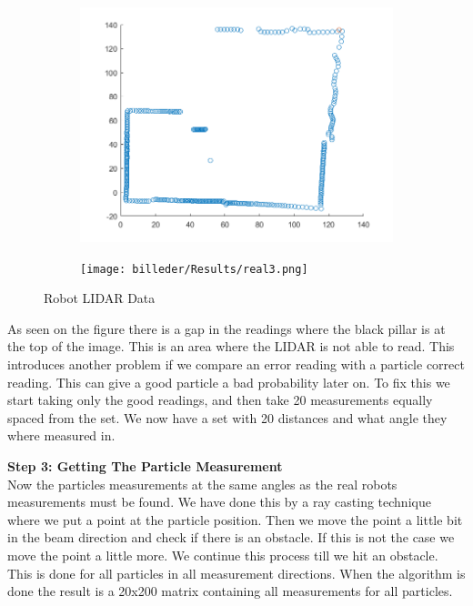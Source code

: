 \begin{figure}[H]
\centering
\begin{subfigure}{.5\textwidth}
  \centering
  \includegraphics[width=1.2\linewidth]{billeder/SeeData.png}
  \label{ResultDriveFig1:sub1}
\end{subfigure}%
\begin{subfigure}{.5\textwidth}
  \centering
  \texttt{[image: billeder/Results/real3.png]}
  \label{ResultDriveFig1:sub2}
\end{subfigure}
\caption{Robot LIDAR Data}
\label{RobotData}
\end{figure}

As seen on the figure there is a gap in the readings where the black pillar is at the top of the image. This is an area where the LIDAR is not able to read. This introduces another problem if we compare an error reading with a particle correct reading. This can give a good particle a bad probability later on.
To fix this we start taking only the good readings, and then take 20 measurements equally spaced from the set. We now have a set with 20 distances and what angle they where measured in. 

\textbf{Step 3: Getting The Particle Measurement}\\
Now the particles measurements at the same angles as the real robots measurements must be found. We have done this by a ray casting technique where we put a point at the particle position. Then we move the point a little bit in the beam direction and check if there is an obstacle. If this is not the case we move the point a little more. We continue this process till we hit an obstacle.\\
This is done for all particles in all measurement directions. When the algorithm is done the result is a 20x200 matrix containing all measurements for all particles. 

